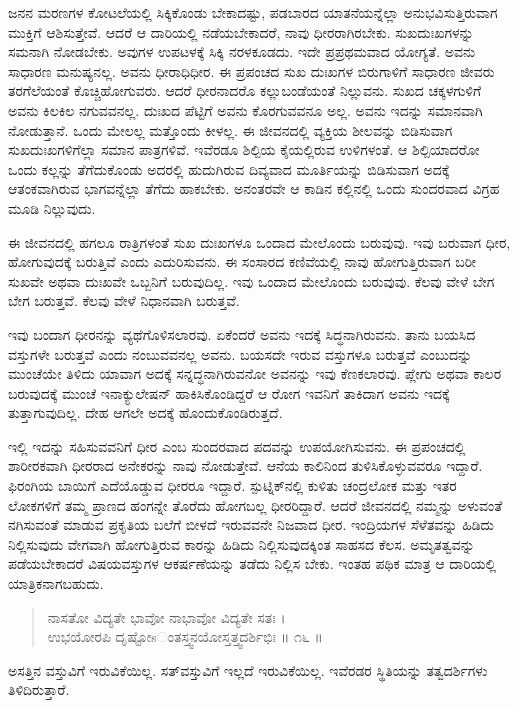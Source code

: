 ಜನನ ಮರಣಗಳ ಕೋಟಲೆಯಲ್ಲಿ ಸಿಕ್ಕಿಕೊಂಡು ಬೇಕಾದಷ್ಟು, ಪಡಬಾರದ ಯಾತನೆಯನ್ನೆಲ್ಲಾ ಅನುಭವಿಸುತ್ತಿರುವಾಗ ಮುಕ್ತಿಗೆ ಆಶಿಸುತ್ತೇವೆ. ಆದರೆ ಆ ದಾರಿಯಲ್ಲಿ ನಡೆಯಬೇಕಾದರೆ, ನಾವು ಧೀರರಾಗಿರಬೇಕು. ಸುಖದುಃಖಗಳನ್ನು ಸಮನಾಗಿ ನೋಡಬೇಕು. ಅವುಗಳ ಉಪಟಳಕ್ಕೆ ಸಿಕ್ಕಿ ನರಳಕೂಡದು. ಇದೇ ಪ್ರಪ್ರಥಮವಾದ ಯೋಗ್ಯತೆ. ಅವನು ಸಾಧಾರಣ ಮನುಷ್ಯನಲ್ಲ. ಅವನು ಧೀರಾಧಿಧೀರ. ಈ ಪ್ರಪಂಚದ ಸುಖ ದುಃಖಗಳ ಬಿರುಗಾಳಿಗೆ ಸಾಧಾರಣ ಜೀವರು ತರಗೆಲೆಯಂತೆ ಕೊಚ್ಚಿಹೋಗುವರು. ಆದರೆ ಧೀರನಾದರೊ ಕಲ್ಲುಬಂಡೆಯಂತೆ ನಿಲ್ಲುವನು. ಸುಖದ ಚಕ್ಕಳಗುಳಿಗೆ ಅವನು ಕಿಲಕಿಲ ನಗುವವನಲ್ಲ. ದುಃಖದ ಪೆಟ್ಟಿಗೆ ಅವನು ಕೊರಗುವವನೂ ಅಲ್ಲ. ಅವನು ಇದನ್ನು ಸಮಾನವಾಗಿ ನೋಡುತ್ತಾನೆ. ಒಂದು ಮೇಲಲ್ಲ ಮತ್ತೊಂದು ಕೀಳಲ್ಲ. ಈ ಜೀವನದಲ್ಲಿ ವ್ಯಕ್ತಿಯ ಶೀಲವನ್ನು ಬಿಡಿಸುವಾಗ ಸುಖದುಃಖಗಳಿಗೆಲ್ಲಾ ಸಮಾನ ಪಾತ್ರಗಳಿವೆ. ಇವೆರಡೂ ಶಿಲ್ಪಿಯ ಕೈಯಲ್ಲಿರುವ ಉಳಿಗಳಂತೆ. ಆ ಶಿಲ್ಪಿಯಾದರೋ ಒಂದು ಕಲ್ಲನ್ನು ತೆಗೆದುಕೊಂಡು ಅದರಲ್ಲಿ ಹುದುಗಿರುವ ದಿವ್ಯವಾದ ಮೂರ್ತಿಯನ್ನು ಬಿಡಿಸುವಾಗ ಅದಕ್ಕೆ ಆತಂಕವಾಗಿರುವ ಭಾಗವನ್ನೆಲ್ಲಾ ತೆಗೆದು ಹಾಕಬೇಕು. ಅನಂತರವೇ ಆ ಕಾಡಿನ ಕಲ್ಲಿನಲ್ಲಿ ಒಂದು ಸುಂದರವಾದ ವಿಗ್ರಹ ಮೂಡಿ ನಿಲ್ಲುವುದು.

ಈ ಜೀವನದಲ್ಲಿ ಹಗಲೂ ರಾತ್ರಿಗಳಂತೆ ಸುಖ ದುಃಖಗಳೂ ಒಂದಾದ ಮೇಲೊಂದು ಬರುವುವು. ಇವು ಬರುವಾಗ ಧೀರ, ಹೋಗುವುದಕ್ಕೆ ಬರುತ್ತಿವೆ ಎಂದು ಎದುರಿಸುವನು. ಈ ಸಂಸಾರದ ಕಣಿವೆಯಲ್ಲಿ ನಾವು ಹೋಗುತ್ತಿರುವಾಗ ಬರೀ ಸುಖವೇ ಅಥವಾ ದುಃಖವೇ ಒಬ್ಬನಿಗೆ ಬರುವುದಿಲ್ಲ. ಇವು ಒಂದಾದ ಮೇಲೊಂದು ಬರುವುವು. ಕೆಲವು ವೇಳೆ ಬೇಗ ಬೇಗ ಬರುತ್ತವೆ. ಕೆಲವು ವೇಳೆ ನಿಧಾನವಾಗಿ ಬರುತ್ತವೆ.

ಇವು ಬಂದಾಗ ಧೀರನನ್ನು ವ್ಯಥೆಗೊಳಿಸಲಾರವು. ಏಕೆಂದರೆ ಅವನು ಇದಕ್ಕೆ ಸಿದ್ಧನಾಗಿರುವನು. ತಾನು ಬಯಸಿದ ವಸ್ತುಗಳೇ ಬರುತ್ತವೆ ಎಂದು ನಂಬುವವನಲ್ಲ ಅವನು. ಬಯಸದೇ ಇರುವ ವಸ್ತುಗಳೂ ಬರುತ್ತವೆ ಎಂಬುದನ್ನು ಮುಂಚೆಯೇ ತಿಳಿದು ಯಾವಾಗ ಅದಕ್ಕೆ ಸನ್ನದ್ಧನಾಗಿರುವನೋ ಅವನನ್ನು ಇವು ಕೆಣಕಲಾರವು. ಪ್ಲೇಗು ಅಥವಾ ಕಾಲರ ಬರುವುದಕ್ಕೆ ಮುಂಚೆ ಇನಾಕ್ಯುಲೇಷನ್ ಹಾಕಿಸಿಕೊಂಡಿದ್ದರೆ ಆ ರೋಗ ಇವನಿಗೆ ತಾಕಿದಾಗ ಅವನು ಇದಕ್ಕೆ ತುತ್ತಾಗುವುದಿಲ್ಲ. ದೇಹ ಆಗಲೇ ಅದಕ್ಕೆ ಹೊಂದುಕೊಂಡಿರುತ್ತದೆ.

ಇಲ್ಲಿ ಇದನ್ನು ಸಹಿಸುವವನಿಗೆ ಧೀರ ಎಂಬ ಸುಂದರವಾದ ಪದವನ್ನು ಉಪಯೋಗಿಸುವನು. ಈ ಪ್ರಪಂಚದಲ್ಲಿ ಶಾರೀರಕವಾಗಿ ಧೀರರಾದ ಅನೇಕರನ್ನು ನಾವು ನೋಡುತ್ತೇವೆ. ಆನೆಯ ಕಾಲಿನಿಂದ ತುಳಿಸಿಕೊಳ್ಳುವವರೂ ಇದ್ದಾರೆ. ಫಿರಂಗಿಯ ಬಾಯಿಗೆ ಎದೆಯೊಡ್ಡುವ ಧೀರರೂ ಇದ್ದಾರೆ. ಸ್ಪುಟ್ನಿಕ್​ನಲ್ಲಿ ಕುಳಿತು ಚಂದ್ರಲೋಕ ಮತ್ತು ಇತರ ಲೋಕಗಳಿಗೆ ತಮ್ಮ ಪ್ರಾಣದ ಹಂಗನ್ನೇ ತೊರೆದು ಹೋಗಬಲ್ಲ ಧೀರರಿದ್ದಾರೆ. ಆದರೆ ಜೀವನದಲ್ಲಿ ನಮ್ಮನ್ನು ಅಳುವಂತೆ ನಗಿಸುವಂತೆ ಮಾಡುವ ಪ್ರಕೃತಿಯ ಬಲೆಗೆ ಬೀಳದೆ ಇರುವವನೇ ನಿಜವಾದ ಧೀರ. ಇಂದ್ರಿಯಗಳ ಸೆಳೆತವನ್ನು ಹಿಡಿದು ನಿಲ್ಲಿಸುವುದು ವೇಗವಾಗಿ ಹೋಗುತ್ತಿರುವ ಕಾರನ್ನು ಹಿಡಿದು ನಿಲ್ಲಿಸುವುದಕ್ಕಿಂತ ಸಾಹಸದ ಕೆಲಸ. ಅಮೃತತ್ವವನ್ನು ಪಡೆಯಬೇಕಾದರೆ ವಿಷಯವಸ್ತುಗಳ ಆಕರ್ಷಣೆಯನ್ನು ತಡೆದು ನಿಲ್ಲಿಸ ಬೇಕು. ಇಂತಹ ಪಥಿಕ ಮಾತ್ರ ಆ ದಾರಿಯಲ್ಲಿ ಯಾತ್ರಿಕನಾಗಬಹುದು.

\begin{verse}
ನಾಸತೋ ವಿದ್ಯತೇ ಭಾವೋ ನಾಭಾವೋ ವಿದ್ಯತೇ ಸತಃ ।\\ಉಭಯೋರಪಿ ದೃಷ್ಟೋsಂತಸ್ತ್ವನಯೋಸ್ತತ್ತ್ವದರ್ಶಿಭಿಃ \num{॥ ೧೬ ॥}
\end{verse}

{\small ಅಸತ್ತಿನ ವಸ್ತುವಿಗೆ ಇರುವಿಕೆಯಿಲ್ಲ. ಸತ್​ವಸ್ತುವಿಗೆ ಇಲ್ಲದೆ ಇರುವಿಕೆಯಿಲ್ಲ. ಇವೆರಡರ ಸ್ಥಿತಿಯನ್ನು ತತ್ವದರ್ಶಿಗಳು ತಿಳಿದಿರುತ್ತಾರೆ.}

